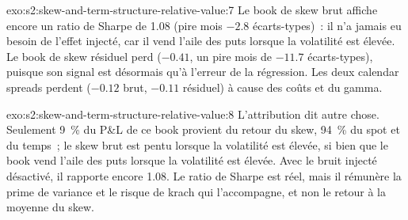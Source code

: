 \begin{solution}{exo:s2:skew-and-term-structure-relative-value:7}
Le book de skew brut affiche encore un ratio de Sharpe de 1.08 (pire mois $-2.8$ écarts-types)~: il n'a jamais eu besoin de l'effet injecté, car il
vend l'aile des puts lorsque la volatilité est élevée. Le book de skew résiduel perd ($-0.41$, un pire mois de $-11.7$ écarts-types), puisque son signal est désormais
qu'à l'erreur de la régression. Les deux calendar spreads perdent ($-0.12$ brut, $-0.11$ résiduel) à cause des coûts et du gamma.
\end{solution}

\begin{solution}{exo:s2:skew-and-term-structure-relative-value:8}
L'attribution dit autre chose. Seulement 9~\% du P\&L de ce book provient du retour du skew, 94~\% du spot et du temps~; le skew brut est pentu lorsque la volatilité est
élevée, si bien que le book vend l'aile des puts lorsque la volatilité est élevée. Avec le bruit injecté désactivé, il rapporte encore 1.08. Le ratio de Sharpe est réel, mais il
rémunère la prime de variance et le risque de krach qui l'accompagne, et non le retour à la moyenne du skew.
\end{solution}

